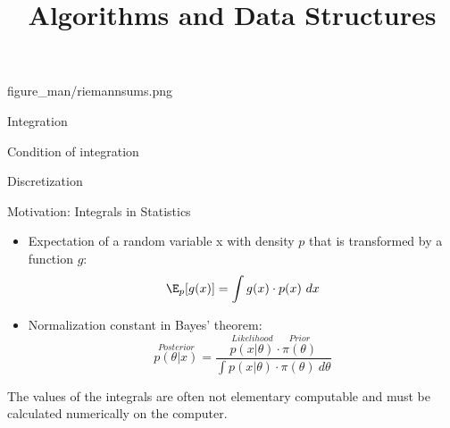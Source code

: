 \documentclass[11pt,compress,t,notes=noshow, xcolor=table]{beamer}
\title{Algorithms and Data Structures}
\begin{document}
{figure_man/riemannsums.png}
{
  \item Integration
  \item Condition of integration
  \item Discretization
}


% 
% 

\begin{vbframe}{Motivation: Integrals in Statistics}

\begin{itemize}
\item Expectation of a random variable x with density $p$ that is transformed by a function $g$:
$$
\E_p[g(x)] = \int g(x)\cdot p(x)~dx
$$
\item Normalization constant in Bayes' theorem:
$$
\overset{Posterior}{p(\theta | x)} = \frac{\overset{Likelihood}{p(x | \theta)} \cdot \overset{Prior}{\pi(\theta)}}{\int p(x | \theta) \cdot \pi(\theta) ~ d\theta}
$$
\end{itemize}

The values of the integrals are often not elementary computable and must be calculated numerically on the computer.

\end{vbframe}
\end{document}
